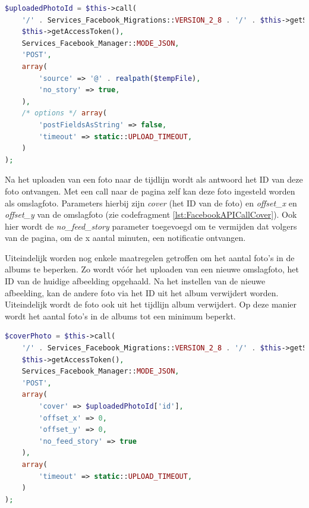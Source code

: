 \begin{lstlisting}[caption={Uploaden van een foto naar Facebook},label=lst:FacebookAPICallUpload,language=PHP]
$uploadedPhotoId = $this->call(
	'/' . Services_Facebook_Migrations::VERSION_2_8 . '/' . $this->getServiceId() . '/photos',
	$this->getAccessToken(),
	Services_Facebook_Manager::MODE_JSON,
	'POST',
	array(
		'source' => '@' . realpath($tempFile),
		'no_story' => true,
	),
	/* options */ array( 
		'postFieldsAsString' => false,
		'timeout' => static::UPLOAD_TIMEOUT,
	)
);
\end{lstlisting}


Na het uploaden van een foto naar de tijdlijn wordt als antwoord het ID van deze foto ontvangen. Met een call naar de pagina zelf kan deze foto ingesteld worden als omslagfoto. Parameters hierbij zijn \textit{cover} (het ID van de foto) en \textit{offset{\_}x} en \textit{offset{\_}y} van de omslagfoto (zie codefragment \ref{lst:FacebookAPICallCover}). Ook hier wordt de \textit{no{\_}feed{\_}story} parameter toegevoegd om te vermijden dat volgers van de pagina, om de x aantal minuten, een notificatie ontvangen. 

Uiteindelijk worden nog enkele maatregelen getroffen om het aantal foto's in de albums te beperken. Zo wordt v\'{o}\'{o}r het uploaden van een nieuwe omslagfoto, het ID van de huidige afbeelding opgehaald. Na het instellen van de nieuwe afbeelding, kan de andere foto via het ID uit het album verwijdert worden. Uiteindelijk wordt de foto ook uit het tijdlijn album verwijdert. Op deze manier wordt het aantal foto's in de albums tot een minimum beperkt.

\begin{lstlisting}[caption={Instellen van omslagfoto op Facebook},label=lst:FacebookAPICallCover,language=PHP]
$coverPhoto = $this->call(
	'/' . Services_Facebook_Migrations::VERSION_2_8 . '/' . $this->getServiceId(),
	$this->getAccessToken(),
	Services_Facebook_Manager::MODE_JSON,
	'POST',
	array(
		'cover' => $uploadedPhotoId['id'],
		'offset_x' => 0,
		'offset_y' => 0,
		'no_feed_story' => true
	),
	array(
		'timeout' => static::UPLOAD_TIMEOUT,
	)
);
\end{lstlisting}

